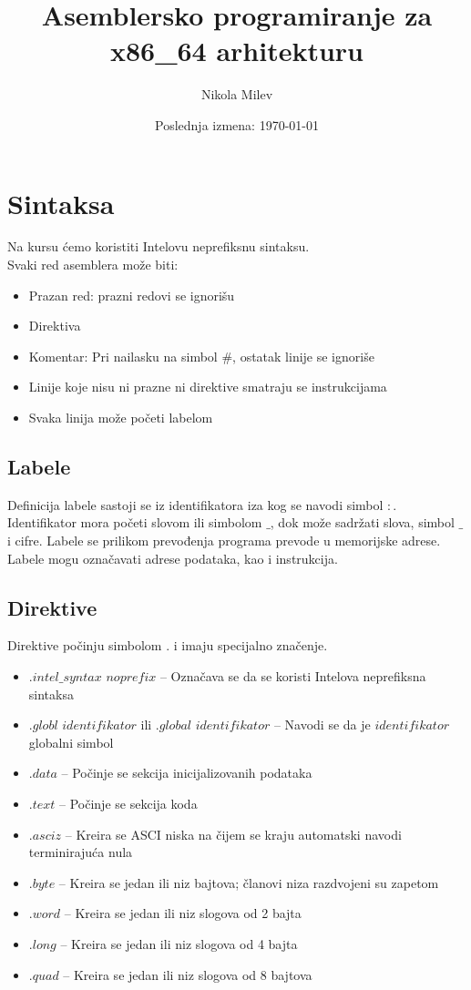 \documentclass[a4paper, 10pt]{article}
\begin{document}
\title{Asemblersko programiranje za x86\_64 arhitekturu}
\author{Nikola Milev}
\date{Poslednja izmena: \today}
\maketitle

\section[1]{Sintaksa}
	Na kursu ćemo koristiti Intelovu neprefiksnu sintaksu. \\ 
	Svaki red asemblera može biti:\\
	\begin{itemize}
		\item Prazan red: prazni redovi se ignorišu
		\item Direktiva
		\item Komentar: Pri nailasku na simbol $\#$, ostatak linije se ignoriše
		\item Linije koje nisu ni prazne ni direktive smatraju se instrukcijama
		\item Svaka linija može početi labelom
	\end{itemize}
	\subsection{Labele}
Definicija labele sastoji se iz identifikatora iza kog se navodi simbol $:$. Identifikator mora početi slovom ili simbolom $\_$, dok može sadržati slova, simbol $\_$ i cifre. Labele se prilikom prevođenja programa prevode u memorijske adrese. Labele mogu označavati adrese podataka, kao i instrukcija.
	\subsection{Direktive}
	Direktive počinju simbolom $.$ i imaju specijalno značenje. 
	\begin{itemize}
		\item $.intel\_syntax$ $noprefix$ -- Označava se da se koristi Intelova neprefiksna sintaksa
		\item $.globl$ $identifikator$ ili $.global$ $identifikator$ -- Navodi se da je $identifikator$ globalni simbol
		\item $.data$ -- Počinje se sekcija inicijalizovanih podataka
		\item $.text$ -- Počinje se sekcija koda
		\item $.asciz$ -- Kreira se ASCI niska na čijem se kraju automatski navodi terminirajuća nula
		\item $.byte$ -- Kreira se jedan ili niz bajtova; članovi niza razdvojeni su zapetom
		\item $.word$ -- Kreira se jedan ili niz slogova od 2 bajta
		\item $.long$ -- Kreira se jedan ili niz slogova od 4 bajta
		\item $.quad$ -- Kreira se jedan ili niz slogova od 8 bajtova
	\end{itemize}
\end{document}
